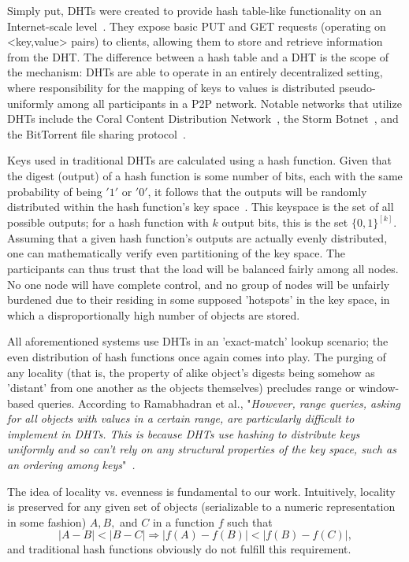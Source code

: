 \documentclass[10pt]{IEEEtran}
\begin{document}
\par Simply put, DHTs were created to provide hash table-like functionality on an Internet-scale level~\cite{Ratnasamy:2001wn}. They expose basic PUT and GET requests (operating on <key,value> pairs) to clients, allowing them to store and retrieve information from the DHT. The difference between a hash table and a DHT is the scope of the mechanism: DHTs are able to operate in an entirely decentralized setting, where responsibility for the mapping of keys to values is distributed pseudo-uniformly among all participants in a P2P network. Notable networks that utilize DHTs include the Coral Content Distribution Network~\cite{Freedman:2004vb}, the Storm Botnet~\cite{Holz:2008uk}, and the BitTorrent file sharing protocol~\cite{Cohen:y1_8mBnw}.

\par Keys used in traditional DHTs are calculated using a hash function. Given that the digest (output) of a hash function is some number of bits, each with the same probability of being $'1'$ or $'0'$, it follows that the outputs will be randomly distributed within the hash function's key space~\cite{Stoica:2001dj}. This keyspace is the set of all possible outputs; for a hash function with $k$ output bits, this is the set $\{0,1\}^{[k]}$. Assuming that a given hash function's outputs are actually evenly distributed, one can mathematically verify even partitioning of the key space. The participants can thus trust that the load will be balanced fairly among all nodes. No one node will have complete control, and no group of nodes will be unfairly burdened due to their residing in some supposed 'hotspots' in the key space, in which a disproportionally high number of objects are stored.

\par All aforementioned systems use DHTs in an 'exact-match' lookup scenario; the even distribution of hash functions once again comes into play. The purging of any locality (that is, the property of alike object's digests being somehow as 'distant' from one another as the objects themselves) precludes range or window-based queries. According to Ramabhadran et al., "\textit{However, range queries, asking for all objects with values in a certain range, are particularly difficult to implement in DHTs. This is because DHTs use hashing to distribute keys uniformly and so can't rely on any structural properties of the key space, such as an ordering among keys}"~\cite{Ramabhadran:2004tr}\textit{.}

The idea of locality vs. evenness is fundamental to our work. Intuitively, locality is preserved for any given set of objects (serializable to a numeric representation in some fashion) $A,B,$ and $C$ in a function $f$ such that
\begin{equation} \label{eq:locality}
|A-B| < |B-C| \Rightarrow |f(A)-f(B)| < |f(B) - f(C)|,
\end{equation}
and traditional hash functions obviously do not fulfill this requirement.
\end{document}
